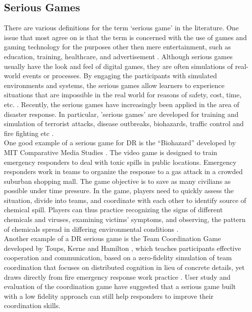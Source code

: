\subsection{Serious Games}
There are various definitions for the term `serious game' in the literature. One issue that most agree on is that the term is concerned with the use of games and gaming technology for the purposes other then mere entertainment, such as education, training, healthcare, and advertisement \citep{Susi2007}. Although serious games usually have the look and feel of digital games, they are often simulations of real-world events or processes. By engaging the participants with simulated environments and systems, the serious games allow learners to experience situations that are impossible in the real world for reasons of safety, cost, time, etc. \citep{Squire2003,Meesters2013}. Recently, the serious games have increasingly been applied in the area of disaster response. In particular, 'serious games' are developed for training and simulation of terrorist attacks, disease outbreaks, biohazards, traffic control and fire fighting etc \citep{Susi2007,Squire2003}. \\

One good example of a serious game for \ac{DR} is the ``Biohazard'' developed by MIT Comparative Media Studies \citep{Squire2003}. The video game is designed to train emergency responders to deal with toxic spills in public locations. Emergency responders work in teams to organize the response to a gas attack in a crowded suburban shopping mall. The game objective is to save as many civilians as possible under time pressure. In the game,  players need to quickly assess the situation, divide into teams, and coordinate with each other to identify source of chemical spill. Players can thus practice recognizing the signs of different chemicals and viruses, examining victims' symptoms, and observing, the pattern of chemicals spread in differing environmental conditions \citep{Susi2007}.\\


Another example of a \ac{DR} serious game is the Team Coordination Game developed by Toups, Kerne and Hamilton \citep{Toups2011}, which teaches participants effective cooperation and communication, based on a zero-fidelity simulation of team coordination that focuses on distributed cognition in lieu of concrete details, yet draws directly from fire emergency response work practice \citep{Toups2011}. User study and evaluation of the coordination game have suggested that a serious game built with a low fidelity approach can still help responders to improve their coordination skills.\\

